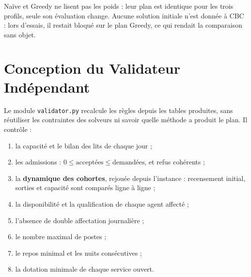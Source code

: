 \begin{table}[H]
    \centering
    \caption{Principe des quatre méthodes.}
    \label{tab:methodes}
\end{table}

Naïve et Greedy ne lisent pas les poids : leur plan est identique pour les trois profils, seule son évaluation change. Aucune solution initiale n'est donnée à CBC : lors d'essais, il restait bloqué sur le plan Greedy, ce qui rendait la comparaison sans objet.

\section{Conception du Validateur Indépendant}

Le module \texttt{validator.py} recalcule les règles depuis les tables produites, sans réutiliser les contraintes des solveurs ni savoir quelle méthode a produit le plan. Il contrôle :
\begin{enumerate}
    \item la capacité et le bilan des lits de chaque jour ;
    \item les admissions : $0 \le \text{acceptées} \le \text{demandées}$, et refus cohérents ;
    \item la \textbf{dynamique des cohortes}, rejouée depuis l'instance : recensement initial, sorties et capacité sont comparés ligne à ligne ;
    \item la disponibilité et la qualification de chaque agent affecté ;
    \item l'absence de double affectation journalière ;
    \item le nombre maximal de postes ;
    \item le repos minimal et les nuits consécutives ;
    \item la dotation minimale de chaque service ouvert.
\end{enumerate}

